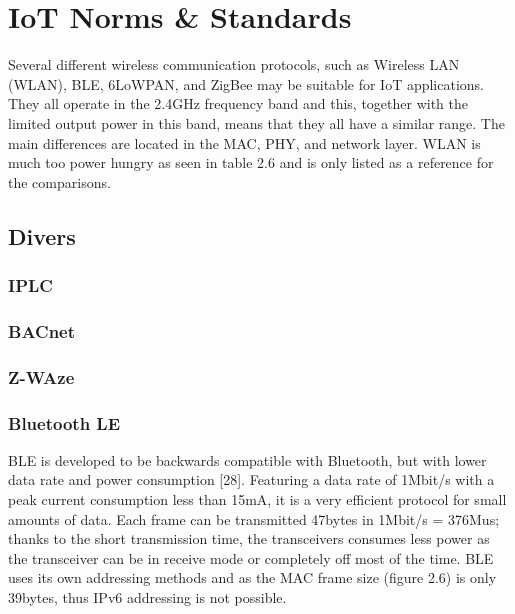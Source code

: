 \section{IoT Norms \& Standards}






Several different wireless communication protocols,
	such as Wireless LAN (WLAN),
	BLE, 6LoWPAN,
	and ZigBee may be suitable for IoT applications.
They all operate in the 2.4GHz frequency band and this,
	together with the limited output power in this band,
	means that they all have a similar range.
The main differences are located in the MAC,
	PHY,
	and network layer.
WLAN is much too power hungry as seen in table 2.6 and is only listed as a reference for the comparisons.


\subsection{Divers}
\subsubsection{IPLC}
\subsubsection{BACnet}
\subsubsection{Z-WAze}
\subsubsection{Bluetooth LE}
BLE is developed to be backwards compatible with Bluetooth,
	but with lower data rate and power consumption [28].
Featuring a data rate of 1Mbit/s with a peak current consumption less than 15mA,
	it is a very efficient protocol for small amounts of data.
Each frame can be transmitted 47bytes in 1Mbit/s = 376Mus;
	thanks to the short transmission time,
	the transceivers consumes less power as the transceiver can be in receive mode or completely off most of the time.
BLE uses its own addressing methods and as the MAC frame size (figure 2.6) is only 39bytes,
	thus IPv6 addressing is not possible.

